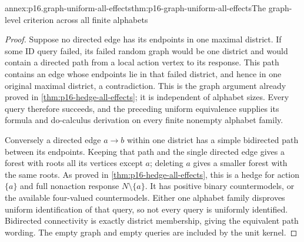 \begin{annexitem}{annex:p16.graph-uniform-all-effects}{thm:p16-graph-uniform-all-effects}{The graph-level criterion across all finite alphabets}
\begin{proof}
Suppose no directed edge has its endpoints in one maximal district.
If some ID query failed, its failed random graph would be one
district and would contain a directed path from a local action
vertex to its response. This path contains an edge whose endpoints
lie in that failed district, and hence in one original maximal
district, a contradiction. This is the graph argument already
proved in \cref{thm:p16-hedge-all-effects}; it is independent
of alphabet sizes. Every query therefore succeeds, and the preceding
uniform equivalence supplies its formula and do-calculus derivation
on every finite nonempty alphabet family.

Conversely a directed edge \(a\to b\) within one district has
a simple bidirected path between its endpoints. Keeping that path
and the single directed edge gives a forest with roots all its
vertices except \(a\); deleting \(a\) gives a smaller forest
with the same roots. As proved in \cref{thm:p16-hedge-all-effects},
this is a hedge for action \(\{a\}\) and full nonaction
response \(N\setminus\{a\}\). It has positive binary
countermodels, or the available four-valued countermodels. Either
one alphabet family disproves uniform identification of that query,
so not every query is uniformly identified. Bidirected connectivity
is exactly district membership, giving the equivalent path wording.
The empty graph and empty queries are included by the unit kernel.
\end{proof}
\end{annexitem}

